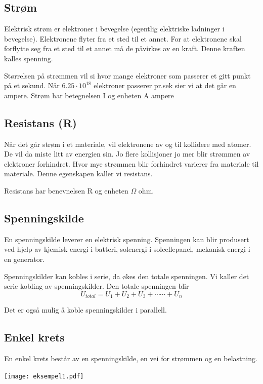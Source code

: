\documentclass[12pt,a4paper]{article}
\begin{document}
\subsection{Strøm}

Elektrisk strøm er elektroner i bevegelse (egentlig elektriske ladninger
i bevegelse). Elektronene flyter fra et sted til et annet. For at
elektronene skal forflytte seg fra et sted til et annet må de påvirkes
av en kraft. Denne kraften kalles spenning. 

Størrelsen på strømmen vil si hvor mange elektroner som passerer et
gitt punkt på et sekund. Når $6.25\cdot10^{18}$ elektroner passerer
pr.sek sier vi at det går en ampere. Strøm har betegnelsen I og enheten
A ampere 

\subsection{Resistans (R)}

Når det går strøm i et materiale, vil elektronene av og til kollidere
med atomer. De vil da miste litt av energien sin. Jo flere kollisjoner
jo mer blir strømmen av elektroner forhindret. Hvor mye strømmen blir
forhindret varierer fra materiale til materiale. Denne egenskapen
kaller vi resistans. 

Resistans har benevnelsen R og enheten $\Omega$ ohm. 

\subsection{Spenningskilde}

En spenningskilde leverer en elektrisk spenning. Spenningen kan blir
produsert ved hjelp av kjemisk energi i batteri, solenergi i solcellepanel,
mekanisk energi i en generator. 

Spenningskilder kan kobles i serie, da økes den totale spenningen.
Vi kaller det serie kobling av spenningskilder. Den totale spenningen
blir
\[
U_{total}=U_{1}+U_{2}+U_{3}+\cdots\cdots+U_{n}
\]

Det er også mulig å koble spenningskilder i parallell. 


\subsection{Enkel krets}

En enkel krets består av en spenningskilde, en vei for strømmen og
en belastning. 

\texttt{[image: eksempel1.pdf]}
\end{document}
